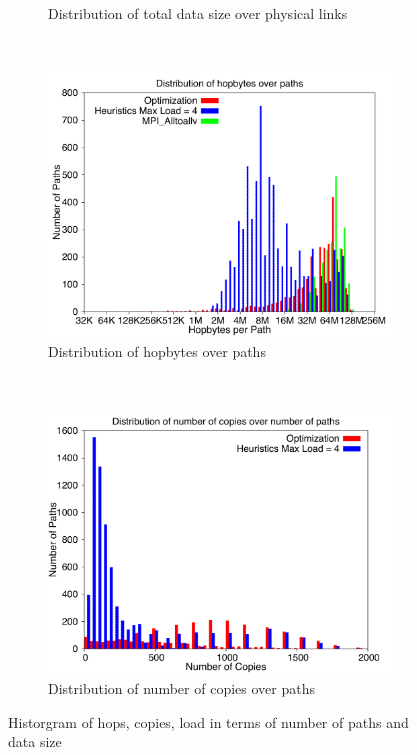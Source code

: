 \begin{figure}[!htbp]
\begin{subfigure}[b]{0.49\textwidth}
                \caption{Distribution of total data size over physical links}
                \label{fig:3_4096_loaddata}
        \end{subfigure}
        ~ %
        \begin{subfigure}[b]{0.49\textwidth}
                \includegraphics[width=\textwidth]{report_figures/constantr/3_4096/hopbyte_histo.pdf}
                \caption{Distribution of hopbytes over paths}
                \label{fig:3_4096_hopbyte}
        \end{subfigure}
        ~ %
        \begin{subfigure}[b]{0.49\textwidth}
                \includegraphics[width=\textwidth]{report_figures/constantr/3_4096/hopcopy_histo.pdf}
                \caption{Distribution of number of copies over paths}
                \label{fig:3_4096_hopcopy}
        \end{subfigure}
        \caption{Historgram of hops, copies, load in terms of number of paths and data size}
        \label{fig:3_4096_histo}
\end{figure}

